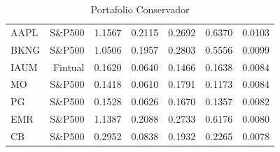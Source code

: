 \begin{table}[htbp]
\begin{tabular}{lrrrrrr}
AAPL & S\&P500 & 1.1567 & 0.2115 & 0.2692 & 0.6370 & 0.0103 \\
BKNG & S\&P500 & 1.0506 & 0.1957 & 0.2803 & 0.5556 & 0.0099 \\
IAUM & Fintual & 0.1620 & 0.0640 & 0.1466 & 0.1638 & 0.0084 \\
MO & S\&P500 & 0.1418 & 0.0610 & 0.1791 & 0.1173 & 0.0084 \\
PG & S\&P500 & 0.1528 & 0.0626 & 0.1670 & 0.1357 & 0.0082 \\
EMR & S\&P500 & 1.1387 & 0.2088 & 0.2733 & 0.6176 & 0.0080 \\
CB & S\&P500 & 0.2952 & 0.0838 & 0.1932 & 0.2265 & 0.0078 \\
\hline
\end{tabular}
\caption{Portafolio Conservador}
\label{tab:portafolio-conservative}
\end{table}